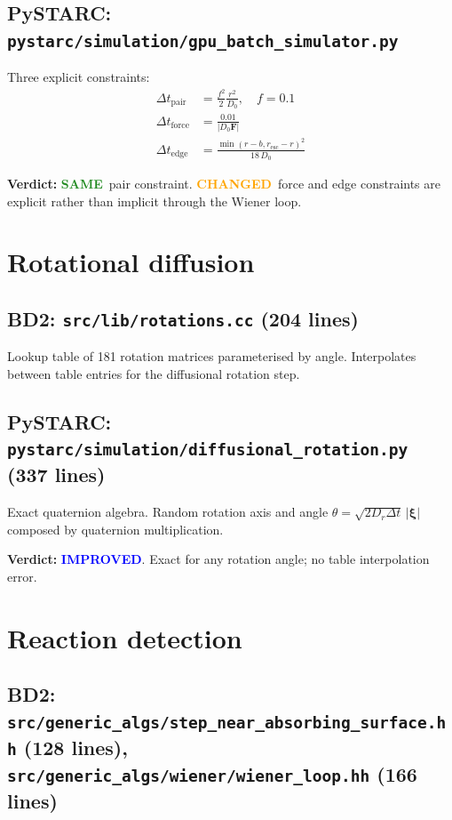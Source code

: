 \documentclass[11pt]{article}
\newcommand{\same}{\textcolor{ForestGreen}{\textbf{SAME}}}
\newcommand{\improved}{\textcolor{Blue}{\textbf{IMPROVED}}}
\newcommand{\changed}{\textcolor{Orange}{\textbf{CHANGED}}}
\begin{document}
\subsection{PySTARC: \texttt{pystarc/simulation/gpu\_batch\_simulator.py}}
Three explicit constraints:
\begin{align}
\Delta t_\mathrm{pair} &= \frac{f^2}{2}\frac{r^2}{D_0}, \quad f = 0.1 \\
\Delta t_\mathrm{force} &= \frac{0.01}{|D_0\mathbf{F}|} \\
\Delta t_\mathrm{edge} &= \frac{\min(r-b, r_\mathrm{esc}-r)^2}{18\,D_0}
\end{align}

\textbf{Verdict:} \same\ pair constraint. \changed\ force and edge constraints
are explicit rather than implicit through the Wiener loop.


\section{Rotational diffusion}

\subsection{BD2: \texttt{src/lib/rotations.cc} (204 lines)}
Lookup table of 181 rotation matrices parameterised by angle.
Interpolates between table entries for the diffusional rotation step.

\subsection{PySTARC: \texttt{pystarc/simulation/diffusional\_rotation.py} (337 lines)}
Exact quaternion algebra. Random rotation axis and angle
$\theta = \sqrt{2D_r\Delta t}\,|\boldsymbol{\xi}|$
composed by quaternion multiplication.

\textbf{Verdict:} \improved. Exact for any rotation angle; no table interpolation error.


\section{Reaction detection}

\subsection{BD2: \texttt{src/generic\_algs/step\_near\_absorbing\_surface.hh} (128 lines),
\texttt{src/generic\_algs/wiener/wiener\_loop.hh} (166 lines)}
\end{document}
